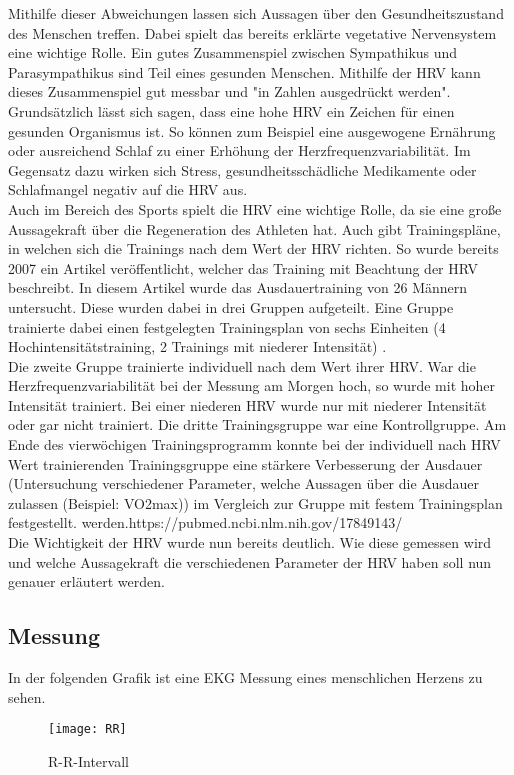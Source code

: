 Mithilfe dieser Abweichungen lassen sich Aussagen über den Gesundheitszustand des Menschen treffen. Dabei spielt das bereits erklärte vegetative Nervensystem eine wichtige Rolle. Ein gutes Zusammenspiel zwischen Sympathikus und Parasympathikus sind Teil eines gesunden Menschen. Mithilfe der HRV kann dieses Zusammenspiel gut messbar und "in Zahlen ausgedrückt werden". 
Grundsätzlich lässt sich sagen, dass eine hohe HRV ein Zeichen für einen gesunden Organismus ist. So können zum Beispiel eine ausgewogene Ernährung oder ausreichend Schlaf zu einer Erhöhung der Herzfrequenzvariabilität. Im Gegensatz dazu wirken sich Stress, gesundheitsschädliche Medikamente oder Schlafmangel negativ auf die HRV aus. \\
Auch im Bereich des Sports spielt die HRV eine wichtige Rolle, da sie eine große Aussagekraft über die Regeneration des Athleten hat. Auch gibt Trainingspläne, in welchen sich die Trainings nach dem Wert der HRV richten. So wurde bereits 2007 ein Artikel veröffentlicht, welcher das Training mit Beachtung der HRV beschreibt. In diesem Artikel wurde das Ausdauertraining von 26 Männern untersucht. Diese wurden dabei in drei Gruppen aufgeteilt. Eine Gruppe trainierte dabei einen festgelegten Trainingsplan von sechs Einheiten (4 Hochintensitätstraining, 2 Trainings mit niederer Intensität) .\\
Die zweite Gruppe trainierte individuell nach dem Wert ihrer HRV. War die Herzfrequenzvariabilität bei der Messung am Morgen hoch, so wurde mit hoher Intensität trainiert. Bei einer niederen HRV wurde nur mit niederer Intensität oder gar nicht trainiert. Die dritte Trainingsgruppe war eine Kontrollgruppe. 
Am Ende des vierwöchigen Trainingsprogramm konnte bei der individuell nach HRV Wert trainierenden Trainingsgruppe eine stärkere Verbesserung der Ausdauer (Untersuchung verschiedener Parameter, welche Aussagen über die Ausdauer zulassen (Beispiel: VO2max)) im Vergleich zur Gruppe mit festem Trainingsplan festgestellt. werden.https://pubmed.ncbi.nlm.nih.gov/17849143/\\

Die Wichtigkeit der HRV wurde nun bereits deutlich. Wie diese gemessen wird und welche Aussagekraft die verschiedenen Parameter der HRV haben soll nun genauer erläutert werden.

\subsection{Messung}
In der folgenden Grafik ist eine EKG Messung eines menschlichen Herzens zu sehen.
\begin{figure}[H]
    \centering
    \texttt{[image: RR]}
    \caption{R-R-Intervall}
    \label{fig:R-R-Intervall}
\end{figure}

